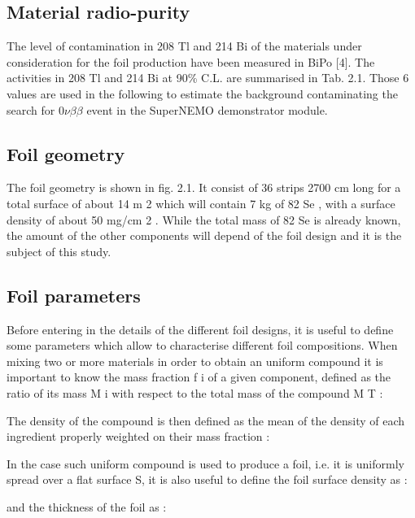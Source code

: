 \documentclass[main.tex]{subfiles}
\begin{document}
\subsection{Material radio-purity}


\NI The level of contamination in 208 Tl and 214 Bi of the materials under consideration for the foil production have been measured in BiPo [4]. The activities in 208 Tl and 214 Bi at 90\% C.L. are summarised in Tab. 2.1. Those 6 values are used in the following to estimate the background contaminating the search for 0$\nu\beta\beta$ event in the SuperNEMO demonstrator module.


\subsection{Foil geometry}


\NI The foil geometry is shown in fig. 2.1. It consist of 36 strips 2700 cm long for a total surface of about 14 m 2 which will contain 7 kg of 82 Se , with a surface density of about 50 mg/cm 2 . While the total mass of 82 Se is already known, the amount of the other components will depend of the foil design and it is the subject of this study.


\subsection{Foil parameters}


\NI Before entering in the details of the different foil designs, it is useful to define some parameters which allow to characterise different foil compositions. When mixing two or more materials in order to obtain an uniform compound it is important to know the mass fraction f i of a given component, defined as the ratio of its mass M i with respect to the total mass of the compound M T :


\bigskip	


\NI The density of the compound is then defined as the mean of the density of each ingredient properly weighted on their mass fraction :


\bigskip


\NI In the case such uniform compound is used to produce a foil, i.e. it is uniformly spread over a flat surface S, it is also useful to define the foil surface density as :


\bigskip


\NI and the thickness of the foil as :


\bigskip
\end{document}
